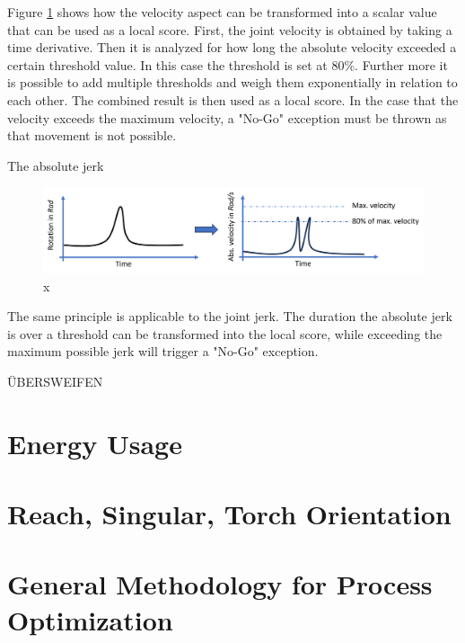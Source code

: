 Figure \ref{velo} shows how the velocity aspect can be transformed into a scalar value that can be used as a local score. First, the joint velocity is obtained by taking a time derivative. Then it is analyzed for how long the absolute velocity exceeded a certain threshold value. In this case the threshold is set at 80\%. Further more it is possible to add multiple thresholds and weigh them exponentially in relation to each other. The combined result is then used as a local score. In the case that the velocity exceeds the maximum velocity, a "No-Go" exception must be thrown as that movement is not possible.
  
The absolute jerk 
\begin{figure}[H]
	\centerline{\includegraphics[scale=.5]{figures/veloy.png}}
	\caption{x}
	\label{velo}
\end{figure}

The same principle is applicable to the joint jerk. The duration the absolute jerk is over a threshold can be transformed into the local score, while exceeding the maximum possible jerk will trigger a "No-Go" exception.


ÜBERSWEIFEN
\section{Energy Usage}
\section{Reach, Singular, Torch Orientation}
\section{General Methodology for Process Optimization}